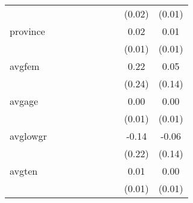 \documentclass{article}
\begin{document}
{\begin{tabular}{l*{9}{c}}
            &                     &                     &                     &                     &                     &                     &                     &      (0.02)         &      (0.01)         \\
[1em]
province    &                     &                     &                     &                     &                     &                     &                     &        0.02         &        0.01         \\
            &                     &                     &                     &                     &                     &                     &                     &      (0.01)         &      (0.01)         \\
[1em]
avgfem      &                     &                     &                     &                     &                     &                     &                     &        0.22         &        0.05         \\
            &                     &                     &                     &                     &                     &                     &                     &      (0.24)         &      (0.14)         \\
[1em]
avgage      &                     &                     &                     &                     &                     &                     &                     &        0.00         &        0.00         \\
            &                     &                     &                     &                     &                     &                     &                     &      (0.01)         &      (0.01)         \\
[1em]
avglowgr    &                     &                     &                     &                     &                     &                     &                     &       -0.14         &       -0.06         \\
            &                     &                     &                     &                     &                     &                     &                     &      (0.22)         &      (0.14)         \\
[1em]
avgten      &                     &                     &                     &                     &                     &                     &                     &        0.01         &        0.00         \\
            &                     &                     &                     &                     &                     &                     &                     &      (0.01)         &      (0.01)         \\

\end{tabular}}
\end{document}
